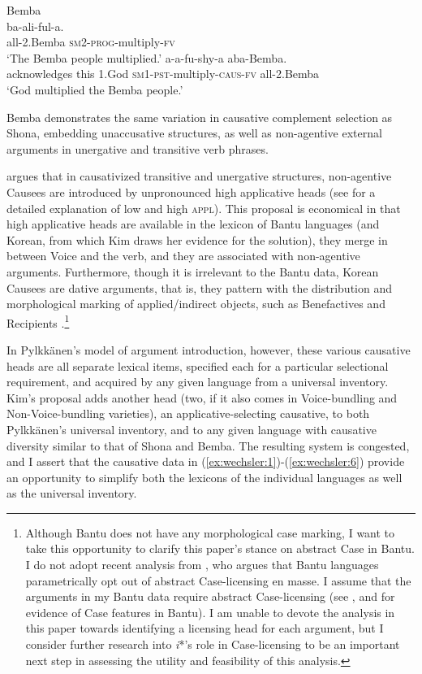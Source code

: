 \documentclass[output=paper,modfonts,nonflat,colorlinks,citecolor=brown]{langsci/langscibook}
\begin{document}
\ea\label{ex:wechsler:6}
Bemba \citep[155]{Givón1969}\\
\ea 
{}  {{ba-ali-ful-a}}.  \\
 {all-2.Bemba}   {\textsc{sm2}{}-\textsc{prog}{}-multiply-\textsc{fv}}  \\
\glt `The Bemba people multiplied.'
\ex
{}  {{a-a-fu-shy-a} }  {{aba-Bemba}}.\\acknowledges this
 1.God  {\textsc{sm1-pst}{}-multiply-\textsc{caus}{}-\textsc{fv}}  {all-2.Bemba}\\
\glt `God multiplied the Bemba people.'
\z
\z

Bemba demonstrates the same variation in causative complement selection as Shona, embedding unaccusative structures, as well as non-agentive external arguments in unergative and transitive verb phrases. 


\citet{Kim2011thesis} argues that in causativized transitive and unergative structures, non-agentive Causees are introduced by unpronounced high applicative heads (see  for a detailed explanation of low and high \textsc{appl).} This proposal is economical in that high applicative heads are available in the lexicon of Bantu languages (and Korean, from which Kim draws her evidence for the solution), they merge in between Voice and the verb, and they are associated with non-agentive arguments. Furthermore, though it is irrelevant to the Bantu data, Korean Causees are dative arguments, that is, they pattern with the distribution and morphological marking of applied/indirect objects, such as Benefactives and Recipients \citep{Kim2011thesis}.\footnote{{Although Bantu does not have any morphological case marking, I want to take this opportunity to clarify this paper's stance on abstract Case in Bantu. I do not adopt recent analysis from} {\citet{Diercks2012}, who argues that Bantu languages parametrically opt out of abstract Case-licensing en masse. I assume that the arguments in my Bantu data require abstract Case-licensing (see} \citealt{vanderWal2015,SheehanvanderWal2016,Halpert2012}, and \citealt{Wechsler2014,Wechsler2016} for evidence of Case features in Bantu). I am unable to devote the analysis in this paper towards identifying a licensing head for each argument, but I consider further research into \textit{i}*’s role in Case-licensing to be an important next step in assessing the utility and feasibility of this analysis.}


In Pylkkänen’s model of argument introduction, however, these various causative heads are all separate lexical items, specified each for a particular selectional requirement, and acquired by any given language from a universal inventory. Kim’s proposal adds another head (two, if it also comes in Voice-bundling and Non-Voice-bundling varieties), an applicative-selecting causative, to both Pylkkänen’s universal inventory, and to any given language with causative diversity similar to that of Shona and Bemba. The resulting system is congested, and I assert that the causative data in (\ref{ex:wechsler:1})-(\ref{ex:wechsler:6}) provide an opportunity to simplify both the lexicons of the individual languages as well as the universal inventory.
\end{document}
